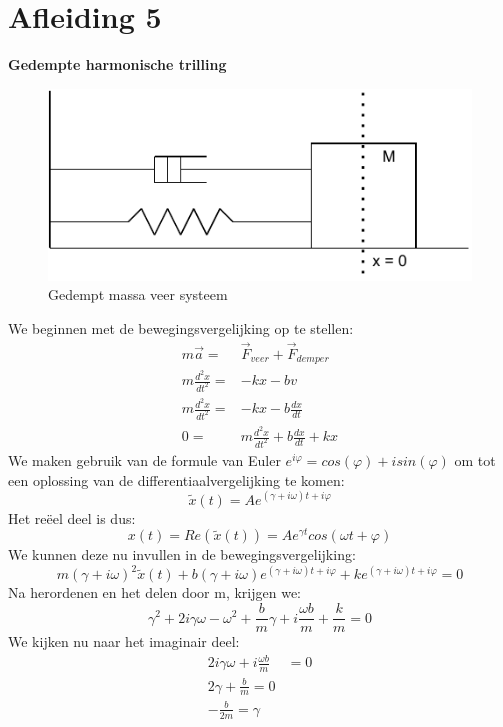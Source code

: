 \documentclass[a4paper,kul]{kulakarticle} %
\begin{document}
\section{Afleiding 5}
\textbf{Gedempte harmonische trilling}\\
\begin{figure}[htbp]
	\centering
	\includegraphics[width=0.7\linewidth]{DempingVeer}
	\caption[Gedempt massa veer systeem]{Gedempt massa veer systeem}
	\label{fig:dempingveer}
\end{figure}
We beginnen met de bewegingsvergelijking op te stellen:
\begin{align*}
	m \vec{a} =& \vec{F}_{veer} + \vec{F}_{demper}\\
	m \frac{d^2x}{dt^2} = & -kx - bv\\
	m \frac{d^2x}{dt^2} = & -kx - b\frac{dx}{dt}\\
	0 = & m \frac{d^2x}{dt^2} + b\frac{dx}{dt} + kx
\end{align*}
We maken gebruik van de formule van Euler $e^{i\varphi}=cos(\varphi) +isin(\varphi)$ om tot een oplossing van de differentiaalvergelijking te komen:
\begin{equation*}
	\widetilde{x}(t) = Ae^{(\gamma +i\omega)t+i\varphi}
\end{equation*}
Het reëel deel is dus:
\begin{equation*}
	x(t) = Re(\widetilde{x}(t)) = Ae^{\gamma t}cos(\omega t + \varphi)
\end{equation*}
We kunnen deze nu invullen in de bewegingsvergelijking:
\begin{equation}
	\label{eq:complexbeweging}
	m(\gamma +i\omega)^2\widetilde{x}(t) + b(\gamma +i\omega)e^{(\gamma +i\omega)t+i\varphi}+ke^{(\gamma +i\omega)t+i\varphi} = 0
\end{equation}
Na herordenen en het delen door m, krijgen we:
\begin{equation*}
	\gamma^2+2i\gamma\omega-\omega^2+\frac{b}{m}\gamma+i\frac{\omega b}{m}+\frac{k}{m}=0
\end{equation*}
We kijken nu naar het imaginair deel:
\begin{align*}
	2i\gamma \omega +i\frac{\omega b}{m}&=0\\
	2\gamma + \frac{b}{m} = 0\\
	-\frac{b}{2m} = \gamma
\end{align*}
\end{document}

